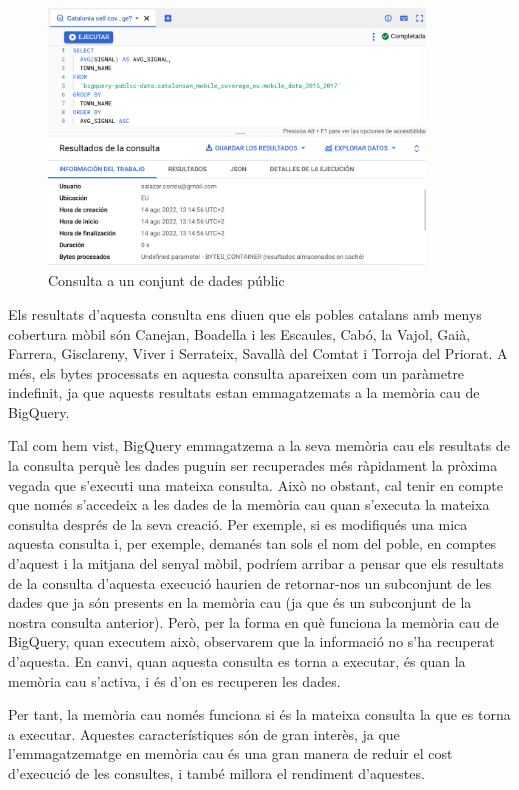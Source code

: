 \documentclass[12pt,longbibliography]{article}
\theoremstyle{definition}
\theoremstyle{remark}
\begin{document}
\begin{figure}[h!]
\begin{center}
\includegraphics[width=10cm]{bq23}
\end{center}
\caption{Consulta a un conjunt de dades públic}
\label{fig:bq23}
\end{figure}


Els resultats d'aquesta consulta ens diuen que els pobles catalans amb menys cobertura mòbil són Canejan, Boadella i les Escaules, Cabó, la Vajol, Gaià, Farrera, Gisclareny, Viver i Serrateix, Savallà del Comtat i Torroja del Priorat. A més, els bytes processats en aquesta consulta apareixen com un paràmetre indefinit, ja que aquests resultats estan emmagatzemats a la memòria cau de BigQuery.



Tal com hem vist, BigQuery emmagatzema a la seva memòria cau els resultats de la consulta perquè les dades puguin ser recuperades més ràpidament la pròxima vegada que s'executi una mateixa consulta. Això no obstant, cal tenir en compte que només s'accedeix a les dades de la memòria cau quan s'executa la mateixa consulta després de la seva creació. Per exemple, si es modifiqués una mica aquesta consulta i, per exemple, demanés tan sols el nom del poble, en comptes d'aquest i la mitjana del senyal mòbil, podríem arribar a pensar que els resultats de la consulta d'aquesta execució haurien de retornar-nos un subconjunt de les dades que ja són presents en la memòria cau (ja que és un subconjunt de la nostra consulta anterior). Però, per la forma en què funciona la memòria cau de BigQuery, quan executem això, observarem que la informació no s'ha recuperat d'aquesta. En canvi, quan aquesta consulta es torna a executar, és quan la memòria cau s'activa, i és d'on es recuperen les dades. 



Per tant, la memòria cau només funciona si és la mateixa consulta la que es torna a executar. Aquestes característiques són de gran interès, ja que l'emmagatzematge en memòria cau és una gran manera de reduir el cost d'execució de les consultes, i també millora el rendiment d'aquestes. 
\end{document}
